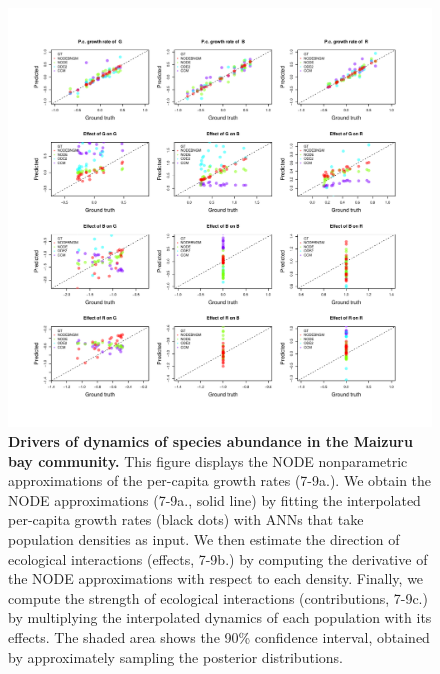 \documentclass[11pt, oneside]{article}
\begin{document}
\begin{figure}[H]
\includegraphics[width=1\linewidth,page=29]{figures/figures_supplementary.pdf}
\caption{
    \textbf{Drivers of dynamics of species abundance in the Maizuru bay community.}
    This figure displays the NODE nonparametric approximations of the per-capita growth rates (7-9a.). 
    We obtain the NODE approximations (7-9a., solid line) by fitting the interpolated per-capita growth rates (black dots) with ANNs that take population densities as input. 
    We then estimate the direction of ecological interactions (effects, 7-9b.) by computing the derivative of the NODE approximations with respect to each density. 
    Finally, we compute the strength of ecological interactions (contributions, 7-9c.) by multiplying the interpolated dynamics of each population with its effects. 
    The shaded area shows the 90\% confidence interval, obtained by approximately sampling the posterior distributions.
}
\end{figure}
\newpage
\end{document}
